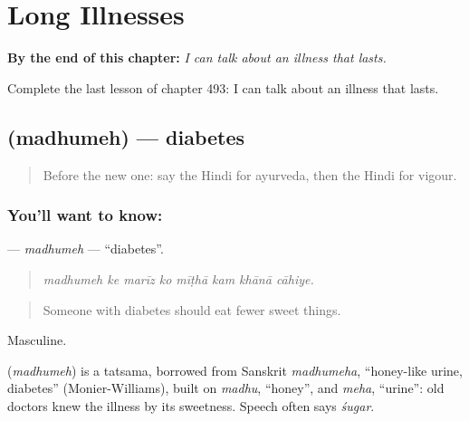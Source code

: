 
\chapter{Long Illnesses}
\label{ch:hi-long-illnesses}

\begin{chapteropening}
\textbf{By the end of this chapter:} \emph{I can talk about an illness that lasts.}

Complete the last lesson of chapter 493: I can talk about an illness that lasts.
\end{chapteropening}

\section[\texorpdfstring{\hi{मधुमेह} (madhumeh)}{मधुमेह (madhumeh)}]{ (madhumeh) — diabetes}

\label{lesson:HI-C493-madhumeh}



\begin{quote}
Before the new one: say the Hindi for ayurveda, then the Hindi for vigour.
\end{quote}

\subsection*{You'll want to know: }
\textbf{} — \emph{madhumeh} — \textquotedblleft{}diabetes\textquotedblright{}.

\begin{quote}
       
\end{quote}

\begin{quote}
\emph{madhumeh ke marīz ko mīṭhā kam khānā cāhiye.}
\end{quote}

\begin{quote}
Someone with diabetes should eat fewer sweet things.
\end{quote}

Masculine.

\begin{cousinweb}
\textbf{} (\emph{madhumeh}) is a tatsama, borrowed from Sanskrit \emph{madhumeha}, \textquotedblleft{}honey-like urine, diabetes\textquotedblright{} (Monier-Williams), built on \emph{madhu}, \textquotedblleft{}honey\textquotedblright{}, and \emph{meha}, \textquotedblleft{}urine\textquotedblright{}: old doctors knew the illness by its sweetness. Speech often says \emph{śugar}.
\end{cousinweb}

